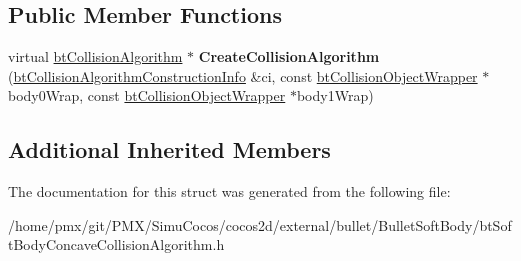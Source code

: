 \subsection*{Public Member Functions}
\begin{DoxyCompactItemize}
\item 
\mbox{\label{structbtSoftBodyConcaveCollisionAlgorithm_1_1SwappedCreateFunc_a601400d940d5de6a843839a2e198c777}} 
virtual \hyperlink{classbtCollisionAlgorithm}{bt\+Collision\+Algorithm} $\ast$ {\bfseries Create\+Collision\+Algorithm} (\hyperlink{structbtCollisionAlgorithmConstructionInfo}{bt\+Collision\+Algorithm\+Construction\+Info} \&ci, const \hyperlink{structbtCollisionObjectWrapper}{bt\+Collision\+Object\+Wrapper} $\ast$body0\+Wrap, const \hyperlink{structbtCollisionObjectWrapper}{bt\+Collision\+Object\+Wrapper} $\ast$body1\+Wrap)
\end{DoxyCompactItemize}
\subsection*{Additional Inherited Members}


The documentation for this struct was generated from the following file\+:\begin{DoxyCompactItemize}
\item 
/home/pmx/git/\+P\+M\+X/\+Simu\+Cocos/cocos2d/external/bullet/\+Bullet\+Soft\+Body/bt\+Soft\+Body\+Concave\+Collision\+Algorithm.\+h\end{DoxyCompactItemize}
